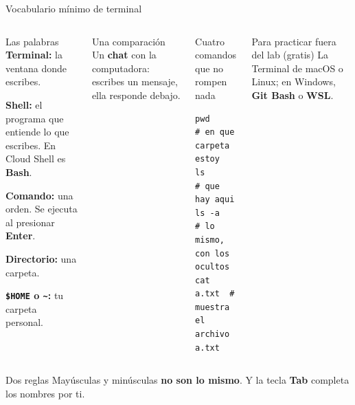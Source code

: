\documentclass[aspectratio=169,10pt,c]{beamer}
\begin{document}
\begin{frame}[fragile]{Vocabulario mínimo de terminal}
\begin{columns}[T,onlytextwidth]
\begin{block}{Las palabras}
\small
\textbf{Terminal:} la ventana donde escribes.\par
\textbf{Shell:} el programa que entiende lo que escribes. En Cloud Shell es \textbf{Bash}.\par
\textbf{Comando:} una orden. Se ejecuta al presionar \textbf{Enter}.\par
\textbf{Directorio:} una carpeta.\par
\textbf{\texttt{\$HOME} o \texttt{\textasciitilde}:} tu carpeta personal.
\end{block}
\begin{exampleblock}{Una comparación}
\small Un \textbf{chat} con la computadora: escribes un mensaje, ella responde debajo.
\end{exampleblock}
\begin{block}{Cuatro comandos que no rompen nada}
\begin{lstlisting}[basicstyle=\ttfamily\footnotesize]
pwd      # en que carpeta estoy
ls       # que hay aqui
ls -a    # lo mismo, con los ocultos
cat a.txt  # muestra el archivo a.txt
\end{lstlisting}
\end{block}
\begin{alertblock}{Para practicar fuera del lab (gratis)}
\small La Terminal de macOS o Linux; en Windows, \textbf{Git Bash} o \textbf{WSL}.
\end{alertblock}
\end{columns}
\begin{block}{Dos reglas}
\small Mayúsculas y minúsculas \textbf{no son lo mismo}. Y la tecla \textbf{Tab} completa los nombres por ti.
\end{block}
\end{frame}
\end{document}
